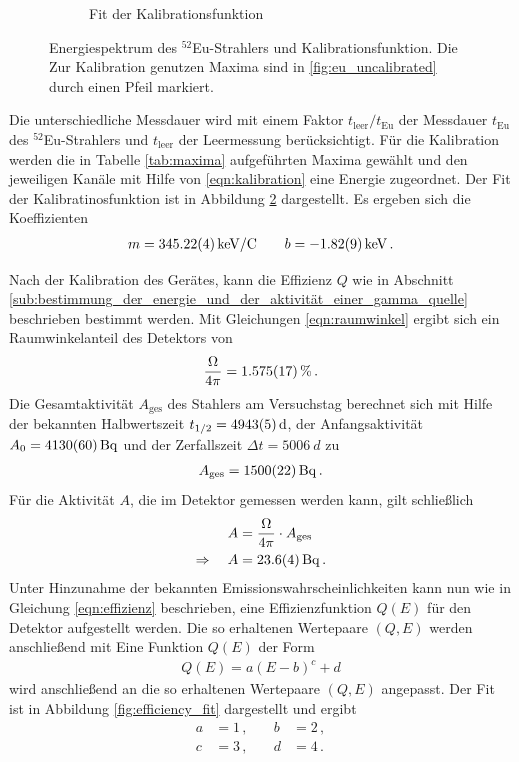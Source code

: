 \begin{figure}[htb]
\begin{subfigure}{.49\linewidth}
        \caption{
            Fit der Kalibrationsfunktion
        }
        \label{fig:calibration}
    \end{subfigure}
    \caption{
        Energiespektrum des $^{52}$Eu-Strahlers und Kalibrationsfunktion. Die Zur Kalibration genutzen Maxima sind in \ref{fig:eu_uncalibrated} durch einen Pfeil markiert.
    }
\end{figure}
Die unterschiedliche Messdauer wird mit einem Faktor $t_\text{leer} / t_\text{Eu}$ der Messdauer $t_\text{Eu}$ des $^{52}$Eu-Strahlers und $t_\text{leer}$ der Leermessung berücksichtigt.
Für die Kalibration werden die in Tabelle \ref{tab:maxima} aufgeführten Maxima gewählt und den jeweiligen Kanäle mit Hilfe von \eqref{eqn:kalibration} eine Energie zugeordnet. Der Fit der Kalibratinosfunktion ist in Abbildung \ref{fig:calibration} dargestellt.
Es ergeben sich die Koeffizienten
%
\begin{align*}
     m = \SI{345.22+-0.04}{keV/C} \qquad b = \SI{-1.82+-0.09}{keV} \,.
\end{align*}

Nach der Kalibration des Gerätes, kann die Effizienz $Q$ wie in Abschnitt \ref{sub:bestimmung_der_energie_und_der_aktivität_einer_gamma_quelle} beschrieben bestimmt werden. Mit Gleichungen \eqref{eqn:raumwinkel} ergibt sich ein Raumwinkelanteil des Detektors von
\begin{align*}
    \frac{\Omega}{4\pi} = \SI{1.575+-0.017}{\percent}\,.
\end{align*}
Die Gesamtaktivität $A_\text{ges}$ des Stahlers am Versuchstag berechnet sich mit Hilfe der bekannten Halbwertszeit $t_{1/2} = \SI{4943+-5}{d}$, der Anfangsaktivität $A_0 = \SI{4130+-60}{\becquerel}$ und der Zerfallszeit $\Delta t = \SI{5006}{d}$ zu
\begin{align*}
    A_\text{ges} = \SI{1500+-22}{\becquerel}\,.
\end{align*}
Für die Aktivität $A$, die im Detektor gemessen werden kann, gilt schließlich
\begin{align*}
    A &= \frac{\Omega}{4\pi}\cdot A_\text{ges}\,\\
    \Rightarrow \quad A &= \SI{23.6+-0.4}{\becquerel}\,.
\end{align*}
Unter Hinzunahme der bekannten Emissionswahrscheinlichkeiten kann nun wie in Gleichung \eqref{eqn:effizienz} beschrieben, eine Effizienzfunktion $Q(E)$ für den Detektor aufgestellt werden.
Die so erhaltenen Wertepaare $(Q,E)$ werden anschließend mit Eine Funktion $Q(E)$ der Form
\begin{align*}
    Q(E) = a (E - b)^c + d
\end{align*}
wird anschließend an die so erhaltenen Wertepaare $(Q,E)$ angepasst. Der Fit ist in Abbildung \ref{fig:efficiency_fit} dargestellt und ergibt
\begin{align*}
    a &= 1\,, &\quad b &= 2\,, \\
    c &= 3\,, &\quad d &= 4\,.
\end{align*}

